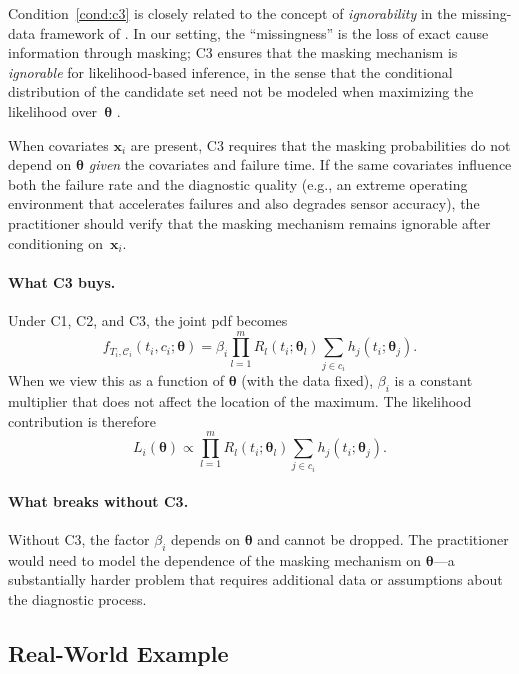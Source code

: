 \documentclass[11pt]{article}
\theoremstyle{definition}
\theoremstyle{plain}
\renewcommand{\v}[1]{\boldsymbol{#1}}
\newcommand{\btheta}{\v{\theta}}
\begin{document}
Condition~\ref{cond:c3} is closely related to the concept of
\emph{ignorability} in the missing-data framework of
\citet{little2002statistical}.
In our setting, the ``missingness'' is the loss of exact cause
information through masking; C3 ensures that the masking mechanism is
\emph{ignorable} for likelihood-based inference, in the sense that the
conditional distribution of the candidate set need not be modeled when
maximizing the likelihood over~$\btheta$
\citep[see][Ch.~6]{little2002statistical}.

When covariates $\v{x}_i$ are present, C3 requires that the masking
probabilities do not depend on $\btheta$ \emph{given} the covariates
and failure time.
If the same covariates influence both the failure rate and the
diagnostic quality (e.g., an extreme operating environment that
accelerates failures and also degrades sensor accuracy), the
practitioner should verify that the masking mechanism remains
ignorable after conditioning on~$\v{x}_i$.

\paragraph{What C3 buys.}
Under C1, C2, and C3, the joint pdf becomes
\begin{equation}
\label{eq:after-c3}
    f_{T_i, \mathcal{C}_i}(t_i, c_i; \btheta)
    = \beta_i \prod_{l=1}^m R_l(t_i; \v{\theta}_l)
        \sum_{j \in c_i} h_j(t_i; \v{\theta}_j).
\end{equation}
When we view this as a function of $\btheta$ (with the data fixed),
$\beta_i$ is a constant multiplier that does not affect the location of
the maximum.
The likelihood contribution is therefore
\begin{equation}
\label{eq:likelihood-exact}
    L_i(\btheta) \propto \prod_{l=1}^m R_l(t_i; \v{\theta}_l)
        \sum_{j \in c_i} h_j(t_i; \v{\theta}_j).
\end{equation}

\paragraph{What breaks without C3.}
Without C3, the factor $\beta_i$ depends on $\btheta$ and cannot be
dropped.
The practitioner would need to model the dependence of the masking
mechanism on $\btheta$---a substantially harder problem that requires
additional data or assumptions about the diagnostic process.

\subsection{Real-World Example}
\label{sec:real-world-example}
\end{document}
